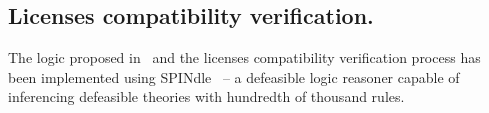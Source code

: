 \begin{figure}[ht!b]
\end{figure}

\subsection{Licenses compatibility verification.}
The logic proposed in~\cite{DBLP:conf/semweb/GovernatoriRVG13} 
and the licenses compatibility verification process has been implemented using SPINdle~\cite{spindle} 
-- a defeasible logic reasoner capable of inferencing defeasible theories with hundredth of thousand rules.

%
\begin{figure}[ht!]
\end{figure}
%

